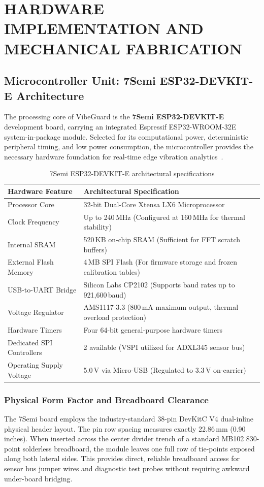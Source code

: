 \chapter{HARDWARE IMPLEMENTATION AND MECHANICAL FABRICATION}
\label{ch:hardware_mechanical}

\section{Microcontroller Unit: 7Semi ESP32-DEVKIT-E Architecture}
The processing core of VibeGuard is the \textbf{7Semi ESP32-DEVKIT-E} development board, carrying an integrated Espressif ESP32-WROOM-32E system-in-package module. Selected for its computational power, deterministic peripheral timing, and low power consumption, the microcontroller provides the necessary hardware foundation for real-time edge vibration analytics~\cite{esp32_devkitc_guide}.

\begin{table}[H]
\centering
\begin{tabular}{|l|l|}
\hline
\textbf{Hardware Feature} & \textbf{Architectural Specification} \\
\hline
Processor Core & 32-bit Dual-Core Xtensa LX6 Microprocessor \\
Clock Frequency & Up to 240\,MHz (Configured at 160\,MHz for thermal stability) \\
Internal SRAM & 520\,KB on-chip SRAM (Sufficient for FFT scratch buffers) \\
External Flash Memory & 4\,MB SPI Flash (For firmware storage and frozen calibration tables) \\
USB-to-UART Bridge & Silicon Labs CP2102 (Supports baud rates up to 921,600\,baud) \\
Voltage Regulator & AMS1117-3.3 (800\,mA maximum output, thermal overload protection) \\
Hardware Timers & Four 64-bit general-purpose hardware timers \\
Dedicated SPI Controllers & 2 available (VSPI utilized for ADXL345 sensor bus) \\
Operating Supply Voltage & 5.0\,V via Micro-USB (Regulated to 3.3\,V on-carrier) \\
\hline
\end{tabular}
\caption{7Semi ESP32-DEVKIT-E architectural specifications}
\label{tab:esp32_specs}
\end{table}

\subsection{Physical Form Factor and Breadboard Clearance}
The 7Semi board employs the industry-standard 38-pin DevKitC V4 dual-inline physical header layout. The pin row spacing measures exactly 22.86\,mm (0.90\,inches). When inserted across the center divider trench of a standard MB102 830-point solderless breadboard, the module leaves one full row of tie-points exposed along both lateral sides. This provides direct, reliable breadboard access for sensor bus jumper wires and diagnostic test probes without requiring awkward under-board bridging.


